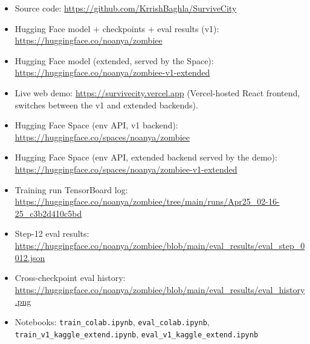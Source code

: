 \documentclass[11pt,a4paper]{article}
\begin{document}
\begin{itemize}[leftmargin=*,nosep]
  \item Source code: \url{https://github.com/KrrishBaghla/SurviveCity}
  \item Hugging Face model + checkpoints + eval results (v1):
        \url{https://huggingface.co/noanya/zombiee}
  \item Hugging Face model (extended, served by the Space):
        \url{https://huggingface.co/noanya/zombiee-v1-extended}
  \item Live web demo: \url{https://survivecity.vercel.app} (Vercel-hosted React frontend, switches between the v1 and extended backends).
  \item Hugging Face Space (env API, v1 backend): \url{https://huggingface.co/spaces/noanya/zombiee}
  \item Hugging Face Space (env API, extended backend served by the demo): \url{https://huggingface.co/spaces/noanya/zombiee-v1-extended}
  \item Training run TensorBoard log: \url{https://huggingface.co/noanya/zombiee/tree/main/runs/Apr25_02-16-25_c3b2d410c5bd}
  \item Step-12 eval results: \url{https://huggingface.co/noanya/zombiee/blob/main/eval_results/eval_step_0012.json}
  \item Cross-checkpoint eval history: \url{https://huggingface.co/noanya/zombiee/blob/main/eval_results/eval_history.png}
  \item Notebooks: \texttt{train\_colab.ipynb}, \texttt{eval\_colab.ipynb}, \texttt{train\_v1\_kaggle\_extend.ipynb}, \texttt{eval\_v1\_kaggle\_extend.ipynb}
\end{itemize}



\end{document}
